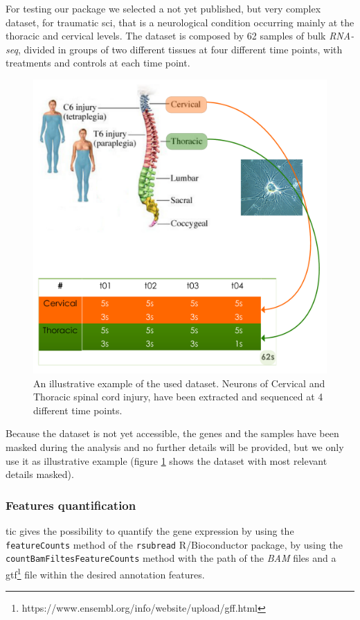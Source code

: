 For testing our package we selected a not yet published, but very complex dataset, for traumatic \gls{sci}, that is a neurological condition occurring mainly at the thoracic and cervical levels.
The dataset is composed by 62 samples of bulk \textit{RNA-seq}, divided in groups of two different tissues at four different time points, with treatments and controls at each time point.

\begin{figure}[H]
\centering
\includegraphics[width=\textwidth, keepaspectratio]{img/ticorser/dataset.pdf}
\caption[ticorser dataset]{An illustrative example of the used dataset. Neurons of Cervical and Thoracic spinal cord injury, have been extracted and sequenced at 4 different time points.}
\label{fig:ticorserdataset}

\end{figure}

Because the dataset is not yet accessible, the genes and the samples have been masked during the analysis and no further details will be provided, but we only use it as illustrative example (figure \ref{fig:ticorserdataset} shows the dataset with most relevant details masked).

\subsubsection{Features quantification}
\gls{tic} gives the possibility to quantify the gene expression by using the \lstinline!featureCounts! method of the \lstinline!rsubread! R/Bioconductor package, by using the \lstinline!countBamFiltesFeatureCounts! method with the path of the \textit{BAM} files and a \gls{gtf}\footnote{https://www.ensembl.org/info/website/upload/gff.html} file within the desired annotation features.

